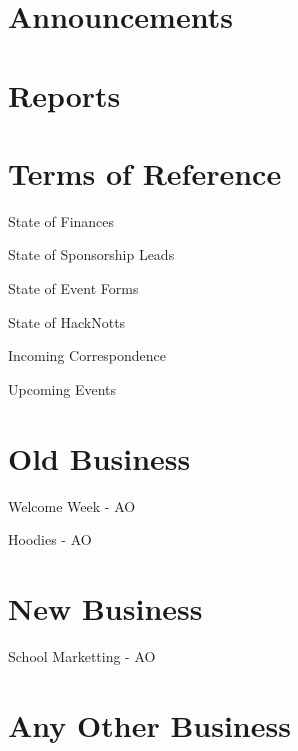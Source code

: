 \documentclass[14pt,agenda]{meetingmins}
\begin{document}
\maketitle

\section{Announcements}

\section{Reports}

\section{Terms of Reference}
\begin{items}
\item {State of Finances}
\item {State of Sponsorship Leads}
\item {State of Event Forms}
\item {State of HackNotts}
\item {Incoming Correspondence}
\item {Upcoming Events}
\end{items}

\section{Old Business}
\begin{items}
\item {Welcome Week - AO}
\item {Hoodies - AO}
\end{items}

\section{New Business}
\begin{items}
\item {School Marketting - AO}
\end{items}

\section{Any Other Business}

\vspace{1em}
\end{document}
